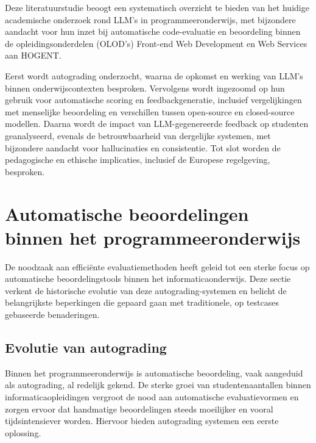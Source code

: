 \vspace{1em}

Deze literatuurstudie beoogt een systematisch overzicht te bieden van het huidige academische onderzoek rond LLM’s in programmeeronderwijs, met bijzondere aandacht voor hun inzet bij automatische code-evaluatie en beoordeling binnen de opleidingsonderdelen (OLOD's) Front-end Web Development en Web Services aan HOGENT.

\vspace{1em}

Eerst wordt autograding onderzocht, waarna de opkomst en werking van LLM’s binnen onderwijscontexten besproken. Vervolgens wordt ingezoomd op hun gebruik voor automatische scoring en feedbackgeneratie, inclusief vergelijkingen met menselijke beoordeling en verschillen tussen open-source en closed-source modellen. Daarna wordt de impact van LLM-gegenereerde feedback op studenten geanalyseerd, evenals de betrouwbaarheid van dergelijke systemen, met bijzondere aandacht voor hallucinaties en consistentie. Tot slot worden de pedagogische en ethische implicaties, inclusief de Europese regelgeving, besproken.


\section{Automatische beoordelingen binnen het programmeeronderwijs}
\label{ch:autograding}

De noodzaak aan efficiënte evaluatiemethoden heeft geleid tot een sterke focus op automatische beoordelingstools binnen het informaticaonderwijs. Deze sectie verkent de historische evolutie van deze autograding-systemen en belicht de belangrijkste beperkingen die gepaard gaan met traditionele, op testcases gebaseerde benaderingen.

\subsection{Evolutie van autograding}

Binnen het programmeeronderwijs is automatische beoordeling, vaak aangeduid als autograding, al redelijk gekend. De sterke groei van studentenaantallen binnen informaticaopleidingen vergroot de nood aan automatische evaluatievormen en zorgen ervoor dat handmatige beoordelingen steeds moeilijker en vooral tijdsintensiever worden. Hiervoor bieden autograding systemen een eerste oplossing.

